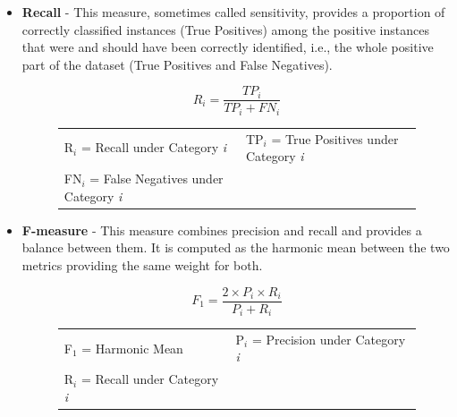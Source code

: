 \begin{itemize}
    \item \textbf{Recall} - This measure, sometimes called sensitivity, provides a proportion of correctly classified instances (True Positives) among the positive instances that were and should have been correctly identified, i.e., the whole positive part of the dataset (True Positives and False Negatives).\\
      \begin{figure}[H]
      \centering
    	\[ R_i = \frac{TP_i}{TP_i+FN_i} \]
      	\begin{tabular}{ll}
        R$_i$ = Recall under Category \textit{i} & TP$_i$ = True Positives under Category \textit{i} \\
        FN$_i$ = False Negatives under Category \textit{i} & 
      \end{tabular}
      \end{figure}

    \item \textbf{F-measure} - This measure combines precision and recall and provides a balance between them. It is computed as the harmonic mean between the two metrics providing the same weight for both.\\
    \begin{figure}[H]
     \centering
      \[ F_1 = \frac{2 \times P_i \times  R_i}{P_i+R_i} \]
     \begin{tabular}{ll}
        F$_1$ = Harmonic  Mean & P$_i$ = Precision under Category \textit{i} \\
        R$_i$ = Recall under Category \textit{i} & 
     \end{tabular}
     \end{figure}
\end{itemize}

